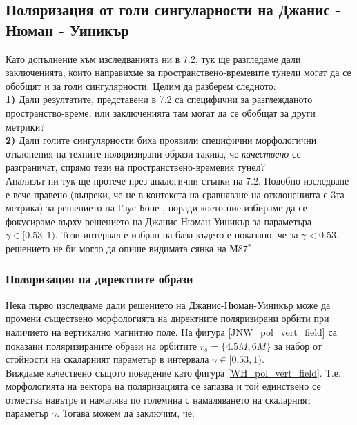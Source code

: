 \subsection{Поляризация от голи сингуларности на Джанис - Нюман - Уиникър}

Като допълнение към изследванията ни в 7.2, тук ще разгледаме дали заключенията, които направихме за пространствено-времевите тунели могат да се обобщят и за голи сингулярности. Целим да разберем следното:\\

\textbf{1)} Дали резултатите, представени в 7.2 са специфични за разглежданото пространство-време, или заключенията там могат да се обобщат за други метрики?\\

\textbf{2)} Дали голите сингулярности биха проявили специфични морфологични отклонения на техните поляризирани образи такива, че \emph{качествено} се разграничат, спрямо тези на пространствено-времевия тунел?\\

Анализът ни тук ще протече през аналогични стъпки на 7.2. Подобно изследване е вече правено (въпреки, че не в контекста на сравняване на отклоненията с 3та метрика) за решението на Гаус-Боне \cite{Qin2021}, поради което ние избираме да се фокусираме върху решението на Джанис-Нюман-Уиникър за параметъра $\gamma \in [0.53, 1)$. Този интервал е избран на база \cite{Kocherlakota2021}  където е показано, че за $\gamma < 0.53$, решението не би могло да опише видимата сянка на М87$^*$. 

\subsubsection{Поляризация на директните образи}

Нека първо изследваме дали решението на Джанис-Нюман-Уиникър може да промени съществено морфологията на директните поляризирани орбити при наличието на вертикално магнитно поле. На фигура \ref{JNW_pol_vert_field} са показани поляризираните образи на орбитите $r_s = \{4.5M,6M\}$ за набор от стойности на скаларният параметър в интервала $\gamma\in[0.53,1)$.\\

Виждаме качествено същото поведение като фигура \ref{WH_pol_vert_field}. Т.е. морфологията на вектора на поляризацията се запазва и той единствено се отмества навътре и намалява по големина с намаляването на скаларният параметър $\gamma$. Тогава можем да заключим, че:\\

